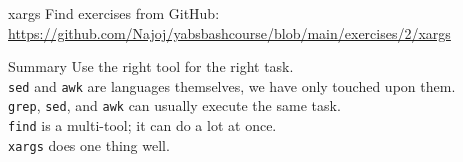 \documentclass{beamer}
\let\tt\texttt
\begin{document}
\begin{frame}{xargs}
        Find exercises from GitHub: \\
        \url{https://github.com/Najoj/yabsbashcourse/blob/main/exercises/2/xargs}
\end{frame}

\begin{frame}{Summary}
        Use the right tool for the right task. \\
        \tt{sed} and \tt{awk} are languages themselves, we have only touched upon them. \\
        \tt{grep}, \tt{sed}, and \tt{awk} can usually execute the same task. \\
        \tt{find} is a multi-tool; it can do a lot at once. \\
        \tt{xargs} does one thing well.
\end{frame}
\end{document}
